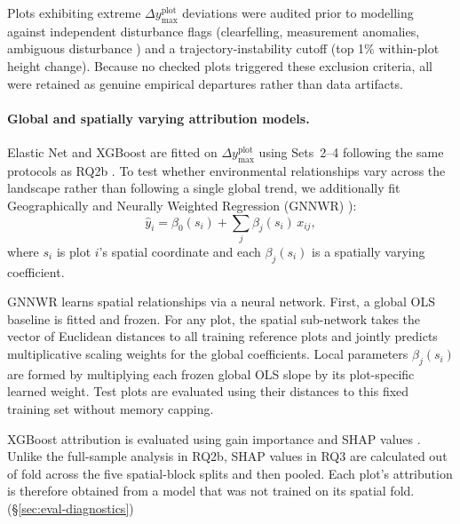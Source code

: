 Plots exhibiting extreme $\Delta y_{\max}^{\text{plot}}$ deviations were audited prior to modelling against independent disturbance flags (clearfelling, measurement anomalies, ambiguous disturbance ) and a trajectory-instability cutoff (top 1\% within-plot height change). Because no checked plots triggered these exclusion criteria, all were retained as genuine empirical departures rather than data artifacts.

\paragraph*{Global and spatially varying attribution models.}
Elastic Net and XGBoost are fitted on $\Delta y_{\max}^{\text{plot}}$ using Sets~2--4 following the same protocols as RQ2b \cite{zou2005Regularization_C4_NN, chen2016XGBoost_C4_NN}. To test whether environmental relationships vary across the landscape rather than following a single global trend, we additionally fit Geographically and Neurally Weighted Regression (GNNWR) \cite{du2020Geographically_C6_GWR}):
\begin{equation}
\hat{y}_i = \beta_0(s_i) + \sum_j \beta_j(s_i)\,x_{ij},
\label{eq:gnnwr}
\end{equation}
where $s_i$ is plot $i$'s spatial coordinate and each $\beta_j(s_i)$ is a spatially varying coefficient. 

GNNWR learns spatial relationships via a neural network. First, a global OLS baseline is fitted and frozen. For any plot, the spatial sub-network takes the vector of Euclidean distances to all training reference plots and jointly predicts multiplicative scaling weights for the global coefficients. Local parameters $\beta_j(s_i)$ are formed by multiplying each frozen global OLS slope by its plot-specific learned weight. Test plots are evaluated using their distances to this fixed training set without memory capping. 

XGBoost attribution is evaluated using gain importance and SHAP values
\citep{lundberg2017}. Unlike the full-sample analysis in RQ2b, SHAP values in
RQ3 are calculated out of fold across the five spatial-block splits and then
pooled. Each plot's attribution is therefore obtained from a model that was
not trained on its spatial fold. (\S\ref{sec:eval-diagnostics})


